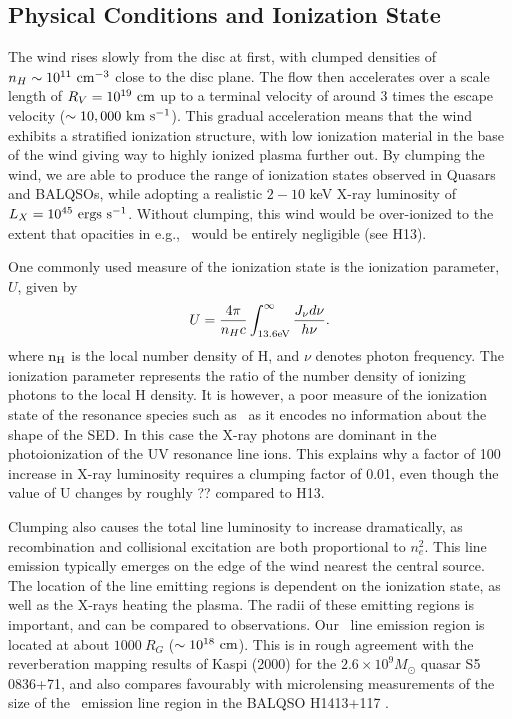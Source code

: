 \documentclass[useAMS,usenatbib]{mn2e_x}
\begin{document}
\subsection{Physical Conditions and Ionization State}

The wind rises slowly from the disc at first, with clumped densities
of $n_H \sim 10^{11}~\rm{cm^{-3}}$ close to the disc plane.
The flow then accelerates over a scale length of $R_V=10^{19}~\rm{cm}$
up to a terminal velocity of around $3$ times the escape velocity 
($\sim10,000~\rm{km~s^{-1}}$). This gradual acceleration means that
the wind exhibits a stratified ionization structure, with low ionization material
in the base of the wind giving way to highly ionized plasma further out.
By clumping the wind, we are able to produce the range of ionization states observed
in Quasars and BALQSOs, while adopting a realistic $2-10$ keV X-ray luminosity
of $L_{X}=10^{45}~\rm{ergs~s^{-1}}$. Without clumping, this wind would be over-ionized 
to the extent that opacities in e.g., \civ\ would be entirely negligible (see H13).

One commonly used measure of the ionization state is the ionization parameter, $U$, given by
\begin{equation}
U = \frac{4\pi}{n_H c}\int_{13.6{\rm{eV}}}^{\infty}\frac{{J_{\nu}d\nu}}{h\nu}.
\end{equation}
\noindent where $\rm{n_H}$ is the local number density of H, and $\nu$ denotes photon 
frequency. The ionization parameter represents the ratio of the number density of 
ionizing photons to the local H density. It is however, a poor measure of the 
ionization state of the resonance species such as \civ\ as it encodes no information
about the shape of the SED. In this case the X-ray photons 
are dominant in the photoionization of the UV resonance line ions. 
This explains why a factor of 100 increase in X-ray luminosity requires
a clumping factor of 0.01, even though the value of U changes by roughly ?? compared to 
H13. 

Clumping also causes the total line luminosity to increase dramatically,
as recombination and collisional excitation are both proportional to
$n_e^2$. This line emission typically emerges on the edge of the wind
nearest the central source. The location of the line emitting regions
is dependent on the ionization state, as well as the X-rays heating the plasma.
The radii of these emitting regions is important,
and can be compared to observations. Our \civ\ line emission region 
is located at about $1000~R_G$ ($\sim10^{18}~\rm{cm}$).
This is in rough agreement with the reverberation mapping 
results of Kaspi (2000) for the $2.6\times10^{9} M_\odot$ quasar S5 0836+71,
and also compares favourably with microlensing measurements of the size of the
\civ\ emission line region in the BALQSO H1413+117 \citep{odowd2015}.
\end{document}
